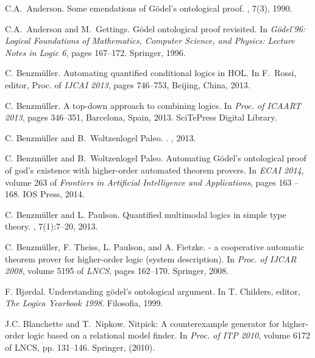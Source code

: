\documentclass{llncs}
\begin{document}
\begin{thebibliography}{10}

C.A.~Anderson.
\newblock Some emendations of {G{\"o}del's} ontological proof.
, 7(3), 1990.


C.A.~Anderson and M.~Gettings.
\newblock G\"odel ontological proof revisited.
\newblock In {\em {G\"odel'96: Logical Foundations of Mathematics, Computer
  Science, and Physics: Lecture Notes in Logic 6}}, pages 167--172. {Springer},
  1996.


C. Benzm{\"u}ller.
\newblock Automating quantified conditional logics in {HOL}.
\newblock In F.~Rossi, editor, Proc. of {\em IJCAI 2013}, pages 746--753, Beijing, China, 2013.

C. Benzm{\"u}ller.
\newblock A top-down approach to combining logics.
\newblock In {\em Proc. of ICAART 2013}, pages 346--351, Barcelona, Spain, 2013.
  SciTePress Digital Library.

C. Benzm\"uller and B.~Woltzenlogel Paleo.
.
, 2013.

C. Benzm{\"u}ller and B.~Woltzenlogel Paleo.
\newblock Automating {G\"{o}del's} ontological proof of god's existence with
  higher-order automated theorem provers.
\newblock In 
  {\em ECAI 2014}, volume 263 of {\em Frontiers in Artificial Intelligence and
  Applications}, pages 163 -- 168. IOS Press, 2014.

C. Benzm{\"u}ller and L. Paulson.
\newblock Quantified multimodal logics in simple type theory.
,
  7(1):7--20, 2013.

C. Benzm{\"u}ller, F. Theiss, L. Paulson, and A. Fietzke.
 - a cooperative automatic theorem prover for higher-order
  logic (system description).
\newblock In 
  {\em Proc. of IJCAR 2008}, volume 5195 of {\em
  LNCS}, pages 162--170. Springer, 2008.

F. Bjørdal.
\newblock Understanding gödel’s ontological argument.
\newblock In T. Childers, editor, {\em The Logica Yearbook 1998}.
  Filosofia, 1999.

J.C. Blanchette and T.~Nipkow.
\newblock Nitpick: A counterexample generator for
  higher-order logic based on a relational model finder. In {\em Proc. of ITP
  2010}, volume 6172 of LNCS, pp. 131--146. Springer, (2010).


\end{thebibliography}
\end{document}

